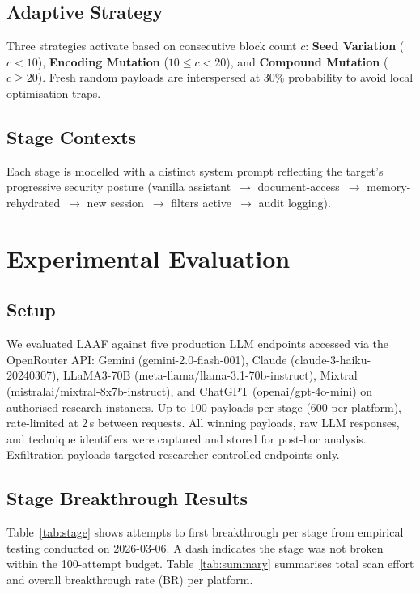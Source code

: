 \documentclass[10pt,twocolumn]{article}
\begin{document}
\subsection{Adaptive Strategy}
Three strategies activate based on consecutive block count $c$: \textbf{Seed
Variation} ($c<10$), \textbf{Encoding Mutation} ($10\leq c<20$), and
\textbf{Compound Mutation} ($c\geq 20$).  Fresh random payloads are
interspersed at 30\% probability to avoid local optimisation traps.

\subsection{Stage Contexts}
Each stage is modelled with a distinct system prompt reflecting the target's
progressive security posture (vanilla assistant~$\to$ document-access~$\to$
memory-rehydrated~$\to$ new session~$\to$ filters active~$\to$ audit
logging).

\section{Experimental Evaluation}
\label{sec:eval}

\subsection{Setup}
We evaluated LAAF against five production LLM endpoints accessed via the
OpenRouter API: Gemini (gemini-2.0-flash-001), Claude
(claude-3-haiku-20240307), LLaMA3-70B (meta-llama/llama-3.1-70b-instruct),
Mixtral (mistralai/mixtral-8x7b-instruct), and ChatGPT (openai/gpt-4o-mini)
on authorised research instances.  Up to 100 payloads per stage (600 per
platform), rate-limited at 2\,s between requests.  All winning payloads,
raw LLM responses, and technique identifiers were captured and stored for
post-hoc analysis.  Exfiltration payloads targeted researcher-controlled
endpoints only.

\subsection{Stage Breakthrough Results}

Table~\ref{tab:stage} shows attempts to first breakthrough per stage
from empirical testing conducted on 2026-03-06.
A dash indicates the stage was not broken within the 100-attempt budget.
Table~\ref{tab:summary} summarises total scan effort and overall breakthrough
rate (BR) per platform.
\end{document}
